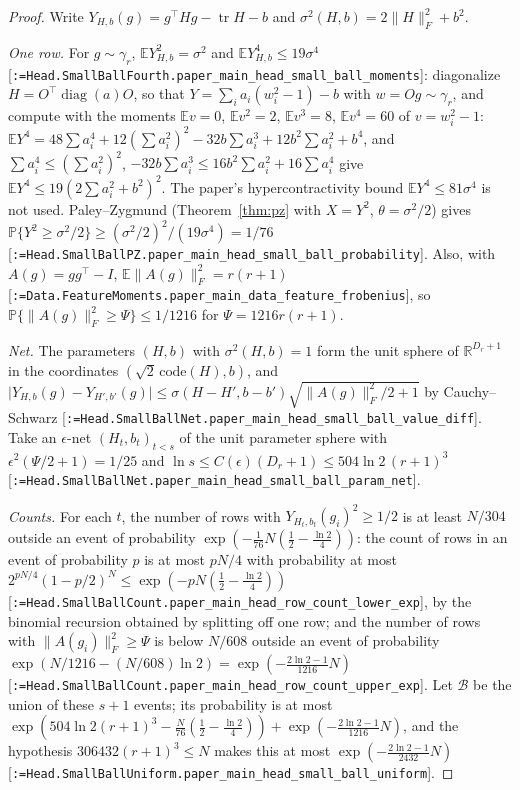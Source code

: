 \documentclass[11pt]{article}
\makeatletter
\newcommand{\formal@break}[1]{\@tfor\formal@tok:=#1\do{%
  \formal@tok
  \expandafter\ifx\formal@tok.\allowbreak\else
  \expandafter\ifx\formal@tok\_\allowbreak\fi\fi}}
\DeclareRobustCommand{\formal}[1]{\textnormal{[\texttt{\small\formal@break{#1}}]}}
\newcommand{\R}{\mathbb{R}}
\newcommand{\E}{\mathbb{E}}
\newcommand{\Prob}{\mathbb{P}}
\newcommand{\norm}[1]{\lVert #1\rVert}
\newcommand{\abs}[1]{\lvert #1\rvert}
\newcommand{\tr}{\operatorname{tr}}
\newcommand{\Fro}{F}
\newcommand{\Id}{I}
\newcommand{\gauss}{\gamma}
\newcommand{\Dd}{D}
\newcommand{\diag}{\operatorname{diag}}
\theoremstyle{plain}
\theoremstyle{definition}
\makeatother
\begin{document}
\begin{proof}
Write $Y_{H,b}(g) = g^{\top}Hg - \tr H - b$ and $\sigma^2(H,b) = 2\norm{H}_\Fro^2 + b^2$.

\emph{One row.} For $g \sim \gauss_r$, $\E Y_{H,b}^2 = \sigma^2$ and
$\E Y_{H,b}^4 \le 19\sigma^4$ \formal{Head.SmallBallFourth.paper\_main\_head\_small\_ball\_moments}:
diagonalize $H = O^{\top}\diag(a)O$, so that $Y = \sum_ia_i(w_i^2 - 1) - b$
with $w = Og \sim \gauss_r$, and compute with the moments $\E v = 0$,
$\E v^2 = 2$, $\E v^3 = 8$, $\E v^4 = 60$ of $v = w_i^2 - 1$:
$\E Y^4 = 48\sum a_i^4 + 12(\sum a_i^2)^2 - 32b\sum a_i^3 + 12b^2\sum a_i^2 + b^4$,
and $\sum a_i^4 \le (\sum a_i^2)^2$, $-32b\sum a_i^3 \le 16b^2\sum a_i^2 + 16\sum a_i^4$
give $\E Y^4 \le 19(2\sum a_i^2 + b^2)^2$. The paper's hypercontractivity
bound $\E Y^4 \le 81\sigma^4$ is not used. Paley--Zygmund
(Theorem~\ref{thm:pz} with $X = Y^2$, $\theta = \sigma^2/2$) gives
$\Prob\{Y^2 \ge \sigma^2/2\} \ge (\sigma^2/2)^2/(19\sigma^4) = 1/76$
\formal{Head.SmallBallPZ.paper\_main\_head\_small\_ball\_probability}.
Also, with $A(g) = gg^{\top} - \Id$, $\E\norm{A(g)}_\Fro^2 = r(r+1)$
\formal{Data.FeatureMoments.paper\_main\_data\_feature\_frobenius}, so
$\Prob\{\norm{A(g)}_\Fro^2 \ge \Psi\} \le 1/1216$ for $\Psi = 1216r(r+1)$.

\emph{Net.} The parameters $(H, b)$ with $\sigma^2(H,b) = 1$ form the unit
sphere of $\R^{\Dd_r + 1}$ in the coordinates $(\sqrt2\,\mathrm{code}(H), b)$,
and $\abs{Y_{H,b}(g) - Y_{H',b'}(g)} \le \sigma(H - H', b - b')\sqrt{\norm{A(g)}_\Fro^2/2 + 1}$
by Cauchy--Schwarz \formal{Head.SmallBallNet.paper\_main\_head\_small\_ball\_value\_diff}.
Take an $\epsilon$-net $(H_t, b_t)_{t<s}$ of the unit parameter sphere with
$\epsilon^2(\Psi/2 + 1) = 1/25$ and $\ln s \le C(\epsilon)(\Dd_r + 1) \le 504\ln2\,(r+1)^3$
\formal{Head.SmallBallNet.paper\_main\_head\_small\_ball\_param\_net}.

\emph{Counts.} For each $t$, the number of rows with $Y_{H_t,b_t}(g_i)^2 \ge 1/2$
is at least $N/304$ outside an event of probability $\exp(-\frac1{76}N(\frac12 - \frac{\ln2}{4}))$:
the count of rows in an event of probability $p$ is at most $pN/4$ with
probability at most $2^{pN/4}(1 - p/2)^N \le \exp(-pN(\frac12 - \frac{\ln 2}{4}))$
\formal{Head.SmallBallCount.paper\_main\_head\_row\_count\_lower\_exp}, by
the binomial recursion obtained by splitting off one row; and the number
of rows with $\norm{A(g_i)}_\Fro^2 \ge \Psi$ is below $N/608$ outside an event
of probability $\exp(N/1216 - (N/608)\ln 2) = \exp(-\frac{2\ln2 - 1}{1216}N)$
\formal{Head.SmallBallCount.paper\_main\_head\_row\_count\_upper\_exp}.
Let $\mathcal{B}$ be the union of these $s + 1$ events; its probability is at
most $\exp(504\ln2(r+1)^3 - \frac{N}{76}(\frac12 - \frac{\ln2}4)) + \exp(-\frac{2\ln2-1}{1216}N)$,
and the hypothesis $306432(r+1)^3 \le N$ makes this at most
$\exp(-\frac{2\ln2-1}{2432}N)$ \formal{Head.SmallBallUniform.paper\_main\_head\_small\_ball\_uniform}.


\end{proof}
\end{document}
